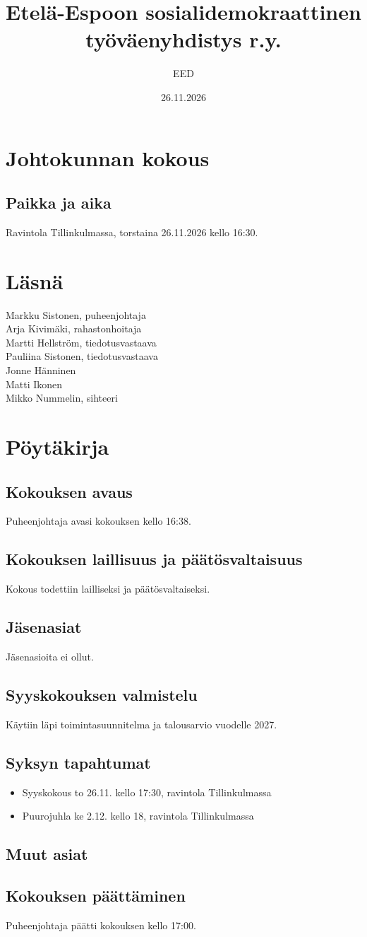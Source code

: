 \documentclass[a4paper,12pt]{article}
\title{Etelä-Espoon sosialidemokraattinen työväenyhdistys r.y.}
\author{EED}
\date{26.11.2026}
\begin{document}
\maketitle
\tableofcontents
\section*{Johtokunnan kokous}
\subsection*{Paikka ja aika}
Ravintola Tillinkulmassa, torstaina 26.11.2026 kello 16:30.
\section*{Läsnä}
Markku Sistonen, puheenjohtaja \\
Arja Kivimäki, rahastonhoitaja \\
Martti Hellström, tiedotusvastaava \\
Pauliina Sistonen, tiedotusvastaava \\
Jonne Hänninen \\
Matti Ikonen \\
Mikko Nummelin, sihteeri
\section*{Pöytäkirja}
\subsection{Kokouksen avaus}
Puheenjohtaja avasi kokouksen kello 16:38.
\subsection{Kokouksen laillisuus ja päätösvaltaisuus}
Kokous todettiin lailliseksi ja päätösvaltaiseksi.
\subsection{Jäsenasiat}
Jäsenasioita ei ollut.
\subsection{Syyskokouksen valmistelu}
Käytiin läpi toimintasuunnitelma ja talousarvio vuodelle 2027.
\subsection{Syksyn tapahtumat}
\begin{itemize}
\item{Syyskokous} to 26.11. kello 17:30, ravintola Tillinkulmassa
\item{Puurojuhla} ke 2.12. kello 18, ravintola Tillinkulmassa
\end{itemize}
\subsection{Muut asiat}
\subsection{Kokouksen päättäminen}
Puheenjohtaja päätti kokouksen kello 17:00.
\end{document}
